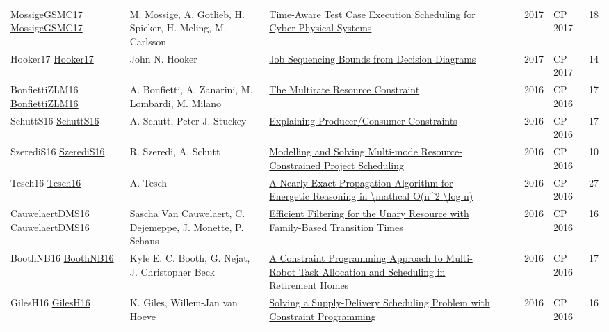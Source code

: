 {\begin{longtable}{p{3cm}p{6cm}p{7cm}rrrp{3cm}r}
MossigeGSMC17 \href{https://doi.org/10.1007/978-3-319-66158-2\_25}{MossigeGSMC17} & M. Mossige, A. Gotlieb, H. Spieker, H. Meling, M. Carlsson & \href{papers/MossigeGSMC17.pdf}{Time-Aware Test Case Execution Scheduling for Cyber-Physical Systems} &  & \cite{MossigeGSMC17} & 2017 & CP 2017 & 18\\
Hooker17 \href{https://doi.org/10.1007/978-3-319-66158-2\_36}{Hooker17} & John N. Hooker & \href{papers/Hooker17.pdf}{Job Sequencing Bounds from Decision Diagrams} &  & \cite{Hooker17} & 2017 & CP 2017 & 14\\
BonfiettiZLM16 \href{https://doi.org/10.1007/978-3-319-44953-1\_8}{BonfiettiZLM16} & A. Bonfietti, A. Zanarini, M. Lombardi, M. Milano & \href{papers/BonfiettiZLM16.pdf}{The Multirate Resource Constraint} &  & \cite{BonfiettiZLM16} & 2016 & CP 2016 & 17\\
SchuttS16 \href{https://doi.org/10.1007/978-3-319-44953-1\_28}{SchuttS16} & A. Schutt, Peter J. Stuckey & \href{papers/SchuttS16.pdf}{Explaining Producer/Consumer Constraints} &  & \cite{SchuttS16} & 2016 & CP 2016 & 17\\
SzerediS16 \href{https://doi.org/10.1007/978-3-319-44953-1\_31}{SzerediS16} & R. Szeredi, A. Schutt & \href{papers/SzerediS16.pdf}{Modelling and Solving Multi-mode Resource-Constrained Project Scheduling} &  & \cite{SzerediS16} & 2016 & CP 2016 & 10\\
Tesch16 \href{https://doi.org/10.1007/978-3-319-44953-1\_32}{Tesch16} & A. Tesch & \href{papers/Tesch16.pdf}{A Nearly Exact Propagation Algorithm for Energetic Reasoning in {\textbackslash}mathcal O(n{\^{}}2 {\textbackslash}log n)} &  & \cite{Tesch16} & 2016 & CP 2016 & 27\\
CauwelaertDMS16 \href{https://doi.org/10.1007/978-3-319-44953-1\_33}{CauwelaertDMS16} & Sascha Van Cauwelaert, C. Dejemeppe, J. Monette, P. Schaus & \href{papers/CauwelaertDMS16.pdf}{Efficient Filtering for the Unary Resource with Family-Based Transition Times} &  & \cite{CauwelaertDMS16} & 2016 & CP 2016 & 16\\
BoothNB16 \href{https://doi.org/10.1007/978-3-319-44953-1\_34}{BoothNB16} & Kyle E. C. Booth, G. Nejat, J. Christopher Beck & \href{papers/BoothNB16.pdf}{A Constraint Programming Approach to Multi-Robot Task Allocation and Scheduling in Retirement Homes} &  & \cite{BoothNB16} & 2016 & CP 2016 & 17\\
GilesH16 \href{https://doi.org/10.1007/978-3-319-44953-1\_38}{GilesH16} & K. Giles, Willem{-}Jan van Hoeve & \href{papers/GilesH16.pdf}{Solving a Supply-Delivery Scheduling Problem with Constraint Programming} &  & \cite{GilesH16} & 2016 & CP 2016 & 16\\

\end{longtable}}
